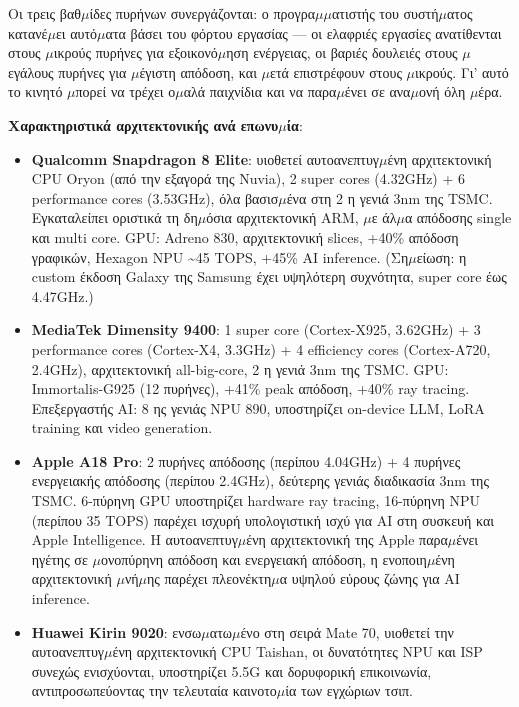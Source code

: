 Οι τρεις βαθ$\mu$ίδες πυρήνων συνεργάζονται: ο προγρα$\mu$$\mu$ατιστής του συστή$\mu$ατος κατανέ$\mu$ει αυτό$\mu$ατα βάσει του φόρτου εργασίας — οι ελαφριές εργασίες ανατίθενται στους $\mu$ικρούς πυρήνες για εξοικονό$\mu$ηση ενέργειας, οι βαριές δουλειές στους $\mu$εγάλους πυρήνες για $\mu$έγιστη απόδοση, και $\mu$ετά επιστρέφουν στους $\mu$ικρούς. Γι' αυτό το κινητό $\mu$πορεί να τρέχει ο$\mu$αλά παιχνίδια και να παρα$\mu$ένει σε ανα$\mu$ονή όλη $\mu$έρα.

\textbf{Χαρακτηριστικά αρχιτεκτονικής ανά επωνυ$\mu$ία}:

\begin{itemize}
  \item \textbf{Qualcomm Snapdragon 8 Elite}: υιοθετεί αυτοανεπτυγ$\mu$ένη αρχιτεκτονική CPU Oryon (από την εξαγορά της Nuvia), 2 super cores (4.32GHz) + 6 performance cores (3.53GHz), όλα βασισ$\mu$ένα στη 2 η γενιά 3nm της TSMC. Εγκαταλείπει οριστικά τη δη$\mu$όσια αρχιτεκτονική ARM, $\mu$ε άλ$\mu$α απόδοσης single και multi core. GPU: Adreno 830, αρχιτεκτονική slices, +40\% απόδοση γραφικών, Hexagon NPU \textasciitilde{}45 TOPS, +45\% AI inference. (Ση$\mu$είωση: η custom έκδοση Galaxy της Samsung έχει υψηλότερη συχνότητα, super core έως 4.47GHz.)
  \item \textbf{MediaTek Dimensity 9400}: 1 super core (Cortex-X925, 3.62GHz) + 3 performance cores (Cortex-X4, 3.3GHz) + 4 efficiency cores (Cortex-A720, 2.4GHz), αρχιτεκτονική all-big-core, 2 η γενιά 3nm της TSMC. GPU: Immortalis-G925 (12 πυρήνες), +41\% peak απόδοση, +40\% ray tracing. Επεξεργαστής AI: 8 ης γενιάς NPU 890, υποστηρίζει on-device LLM, LoRA training και video generation.
  \item \textbf{Apple A18 Pro}: 2 πυρήνες απόδοσης (περίπου 4.04GHz) + 4 πυρήνες ενεργειακής απόδοσης (περίπου 2.4GHz), δεύτερης γενιάς διαδικασία 3nm της TSMC. 6-πύρηνη GPU υποστηρίζει hardware ray tracing, 16-πύρηνη NPU (περίπου 35 TOPS) παρέχει ισχυρή υπολογιστική ισχύ για AI στη συσκευή και Apple Intelligence. Η αυτοανεπτυγ$\mu$ένη αρχιτεκτονική της Apple παρα$\mu$ένει ηγέτης σε $\mu$ονοπύρηνη απόδοση και ενεργειακή απόδοση, η ενοποιη$\mu$ένη αρχιτεκτονική $\mu$νή$\mu$ης παρέχει πλεονέκτη$\mu$α υψηλού εύρους ζώνης για AI inference.
  \item \textbf{Huawei Kirin 9020}: ενσω$\mu$ατω$\mu$ένο στη σειρά Mate 70, υιοθετεί την αυτοανεπτυγ$\mu$ένη αρχιτεκτονική CPU Taishan, οι δυνατότητες NPU και ISP συνεχώς ενισχύονται, υποστηρίζει 5.5G και δορυφορική επικοινωνία, αντιπροσωπεύοντας την τελευταία καινοτο$\mu$ία των εγχώριων τσιπ.
\end{itemize}

